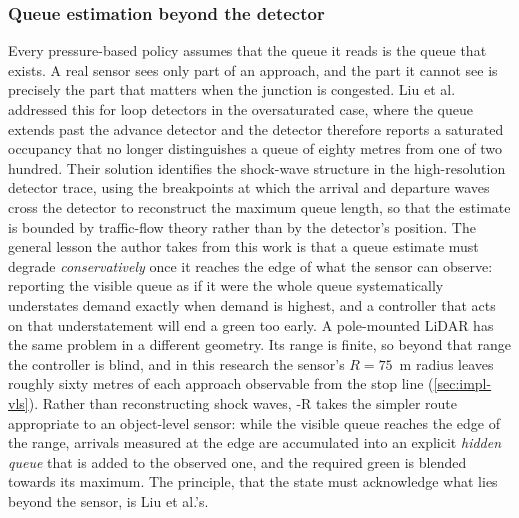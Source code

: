\subsubsection{Queue estimation beyond the detector}
Every pressure-based policy assumes that the queue it reads is the queue that exists. A real sensor sees only
part of an approach, and the part it cannot see is precisely the part that matters when the junction is
congested. Liu et al.\ \cite{liu2009queue} addressed this for loop detectors in the oversaturated case, where
the queue extends past the advance detector and the detector therefore reports a saturated occupancy that no
longer distinguishes a queue of eighty metres from one of two hundred. Their solution identifies the
shock-wave structure in the high-resolution detector trace, using the breakpoints at which the arrival and
departure waves cross the detector to reconstruct the maximum queue length, so that the estimate is bounded by
traffic-flow theory rather than by the detector's position. The general lesson the author takes from this work
is that a queue estimate must degrade \emph{conservatively} once it reaches the edge of what the sensor can
observe: reporting the visible queue as if it were the whole queue systematically understates demand exactly
when demand is highest, and a controller that acts on that understatement will end a green too early. A
pole-mounted LiDAR has the same problem in a different geometry. Its range is finite, so beyond that range the
controller is blind, and in this research the sensor's $R=75$~m radius leaves roughly sixty metres of each
approach observable from the stop line (\cref{sec:impl-vls}). Rather than reconstructing shock waves, \prism{}-R
takes the simpler route appropriate to an object-level sensor: while the visible queue reaches the edge of the
range, arrivals measured at the edge are accumulated into an explicit \emph{hidden queue} that is added to the
observed one, and the required green is blended towards its maximum. The principle, that the state must
acknowledge what lies beyond the sensor, is Liu et al.'s.

